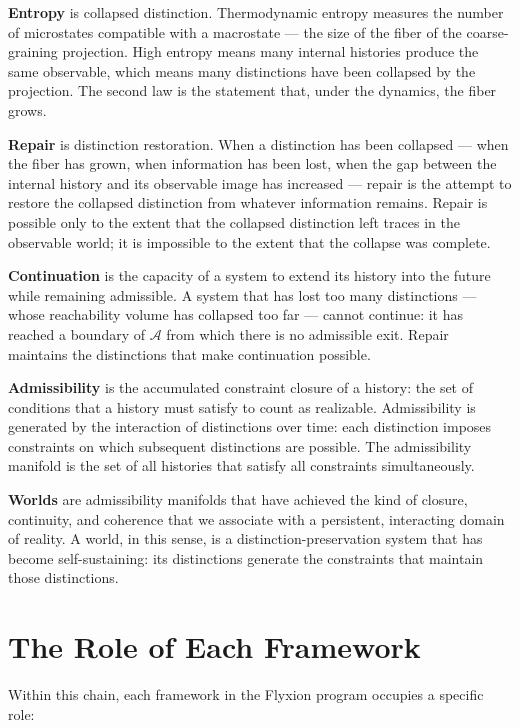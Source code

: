 \documentclass[12pt,a4paper]{book}
\theoremstyle{remark}
\theoremstyle{definition}
\begin{document}
\medskip
\noindent
\textbf{Entropy} is collapsed distinction. Thermodynamic entropy measures
the number of microstates compatible with a macrostate --- the size of
the fiber of the coarse-graining projection. High entropy means many
internal histories produce the same observable, which means many
distinctions have been collapsed by the projection. The second law is
the statement that, under the dynamics, the fiber grows.

\medskip
\noindent
\textbf{Repair} is distinction restoration. When a distinction has been
collapsed --- when the fiber has grown, when information has been lost,
when the gap between the internal history and its observable image has
increased --- repair is the attempt to restore the collapsed distinction
from whatever information remains. Repair is possible only to the extent
that the collapsed distinction left traces in the observable world; it
is impossible to the extent that the collapse was complete.

\medskip
\noindent
\textbf{Continuation} is the capacity of a system to extend its history
into the future while remaining admissible. A system that has lost too
many distinctions --- whose reachability volume has collapsed too far ---
cannot continue: it has reached a boundary of $\mathcal{A}$ from which
there is no admissible exit. Repair maintains the distinctions that make
continuation possible.

\medskip
\noindent
\textbf{Admissibility} is the accumulated constraint closure of a
history: the set of conditions that a history must satisfy to count as
realizable. Admissibility is generated by the interaction of distinctions
over time: each distinction imposes constraints on which subsequent
distinctions are possible. The admissibility manifold is the set of all
histories that satisfy all constraints simultaneously.

\medskip
\noindent
\textbf{Worlds} are admissibility manifolds that have achieved the kind
of closure, continuity, and coherence that we associate with a persistent,
interacting domain of reality. A world, in this sense, is a
distinction-preservation system that has become self-sustaining: its
distinctions generate the constraints that maintain those distinctions.

\section{The Role of Each Framework}

Within this chain, each framework in the Flyxion program occupies a
specific role:
\end{document}
